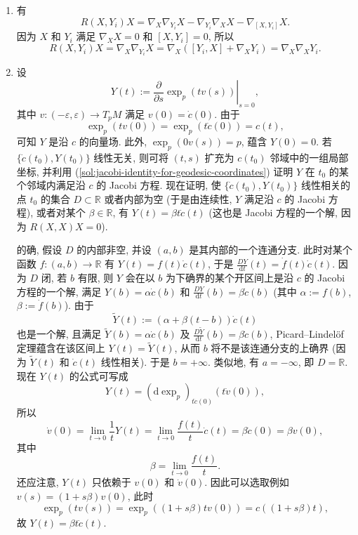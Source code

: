 \begin{description}[font=\normalfont,leftmargin=2em,labelwidth=1.5em]
\begin{enumerate}[label=(\alph*),ref=\alph*,leftmargin=*]
\item\label{sol:jacobi-identity-for-geodesic-coordinates} 有
\[
  R(X,Y_i)X=\nabla_X\nabla_{Y_i}X-\nabla_{Y_i}\nabla_XX-\nabla_{[X,Y_i]}X.
\]
因为 $X$ 和 $Y_i$ 满足 $\nabla_XX=0$ 和 $[X,Y_i]=0$, 所以
\[
  R(X,Y_i)X=\nabla_X\nabla_{Y_i}X=\nabla_X([Y_i,X]+\nabla_XY_i)=\nabla_X\nabla_XY_i.
\]
\item 设
\[
  Y(t):=\left.\frac{\partial}{\partial s}\exp_p(tv(s))\right|_{s=0},
\]
其中 $v:(-\varepsilon,\varepsilon)\to T_pM$ 满足 $v(0)=\dot c(0)$. 由于
\[
  \exp_p(tv(0))=\exp_p(t\dot c(0))=c(t),
\]
可知 $Y$ 是沿 $c$ 的向量场. 此外, $\exp_p(0v(s))=p$, 蕴含 $Y(0)=0$. 若 $\{\dot c(t_0),Y(t_0)\}$ 线性无关, 则可将 $(t,s)$ 扩充为 $c(t_0)$ 邻域中的一组局部坐标, 并利用 (\ref{sol:jacobi-identity-for-geodesic-coordinates}) 证明 $Y$ 在 $t_0$ 的某个邻域内满足沿 $c$ 的 Jacobi 方程. 现在证明, 使 $\{\dot c(t_0),Y(t_0)\}$ 线性相关的点 $t_0$ 的集合 $D\subset\mathbb{R}$ 或者内部为空 (于是由连续性, $Y$ 满足沿 $c$ 的 Jacobi 方程), 或者对某个 $\beta\in\mathbb{R}$, 有 $Y(t)=\beta t\dot c(t)$ (这也是 Jacobi 方程的一个解, 因为 $R(X,X)X=0$).

的确, 假设 $D$ 的内部非空, 并设 $(a,b)$ 是其内部的一个连通分支. 此时对某个函数 $f:(a,b)\to\mathbb{R}$ 有 $Y(t)=f(t)\dot c(t)$, 于是 $\frac{DY}{\mathrm{d}t}(t)=\dot f(t)\dot c(t)$. 因为 $D$ 闭, 若 $b$ 有限, 则 $Y$ 会在以 $b$ 为下确界的某个开区间上是沿 $c$ 的 Jacobi 方程的一个解, 满足 $Y(b)=\alpha\dot c(b)$ 和 $\frac{DY}{\mathrm{d}t}(b)=\beta\dot c(b)$ (其中 $\alpha:=f(b)$, $\beta:=\dot f(b)$). 由于
\[
  \widetilde Y(t):=(\alpha+\beta(t-b))\dot c(t)
\]
也是一个解, 且满足 $\widetilde Y(b)=\alpha\dot c(b)$ 及 $\frac{D\widetilde Y}{\mathrm{d}t}(b)=\beta\dot c(b)$, Picard–Lindelöf 定理蕴含在该区间上 $Y(t)=\widetilde Y(t)$, 从而 $b$ 将不是该连通分支的上确界 (因为 $\widetilde Y(t)$ 和 $\dot c(t)$ 线性相关). 于是 $b=+\infty$. 类似地, 有 $a=-\infty$, 即 $D=\mathbb{R}$. 现在 $Y(t)$ 的公式可写成
\[
  Y(t)=(\mathrm{d}\exp_p)_{t\dot c(0)}(t\dot v(0)),
\]
所以
\[
  \dot v(0)=\lim_{t\to0}\frac1tY(t)
    =\lim_{t\to0}\frac{f(t)}{t}\dot c(t)=\beta\dot c(0)=\beta v(0),
\]
其中
\[
  \beta=\lim_{t\to0}\frac{f(t)}{t}.
\]
还应注意, $Y(t)$ 只依赖于 $v(0)$ 和 $\dot v(0)$. 因此可以选取例如 $v(s)=(1+s\beta)v(0)$, 此时
\[
  \exp_p(tv(s))=\exp_p((1+s\beta)tv(0))=c((1+s\beta)t),
\]
故 $Y(t)=\beta t\dot c(t)$.


\end{enumerate}
\end{description}
